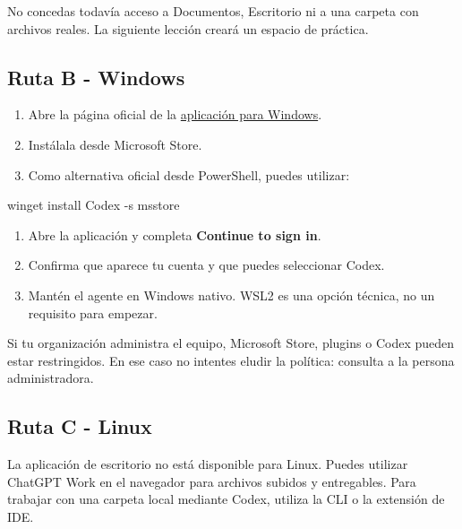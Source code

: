 \documentclass[10pt,a4paper,openany]{book}
\providecommand{\tightlist}{\setlength{\itemsep}{0.18em}\setlength{\parskip}{0pt}}
\newenvironment{Shaded}{}{}
\newcommand{\NormalTok}[1]{#1}
\newcommand{\OperatorTok}[1]{\textcolor[rgb]{0.40,0.40,0.40}{#1}}
\renewenvironment{Shaded}
  {\begin{tcolorbox}[
    enhanced,
    breakable,
    colback=CodeBg,
    colframe=Border,
    boxrule=0.5pt,
    arc=2mm,
    left=3mm,
    right=3mm,
    top=2.2mm,
    bottom=2.2mm,
    before skip=0.8em,
    after skip=0.9em
  ]}
  {\end{tcolorbox}}
\begin{document}
No concedas todavía acceso a Documentos, Escritorio ni a una carpeta con
archivos reales. La siguiente lección creará un espacio de práctica.

\subsection{Ruta B - Windows}\label{ruta-b---windows}

\begin{enumerate}
\def\labelenumi{\arabic{enumi}.}
\tightlist
\item
  Abre la página oficial de la
  \href{https://learn.chatgpt.com/docs/windows/windows-app}{aplicación
  para Windows}.
\item
  Instálala desde Microsoft Store.
\item
  Como alternativa oficial desde PowerShell, puedes utilizar:
\end{enumerate}

\begin{Shaded}
\begin{Highlighting}[]
\NormalTok{winget install Codex }\OperatorTok{{-}}\NormalTok{s msstore}
\end{Highlighting}
\end{Shaded}

\begin{enumerate}
\def\labelenumi{\arabic{enumi}.}
\setcounter{enumi}{3}
\tightlist
\item
  Abre la aplicación y completa \textbf{Continue to sign in}.
\item
  Confirma que aparece tu cuenta y que puedes seleccionar Codex.
\item
  Mantén el agente en Windows nativo. WSL2 es una opción técnica, no un
  requisito para empezar.
\end{enumerate}

Si tu organización administra el equipo, Microsoft Store, plugins o
Codex pueden estar restringidos. En ese caso no intentes eludir la
política: consulta a la persona administradora.

\subsection{Ruta C - Linux}\label{ruta-c---linux}

La aplicación de escritorio no está disponible para Linux. Puedes
utilizar ChatGPT Work en el navegador para archivos subidos y
entregables. Para trabajar con una carpeta local mediante Codex, utiliza
la CLI o la extensión de IDE.
\end{document}
